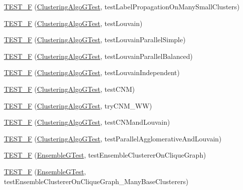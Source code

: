 \begin{DoxyCompactItemize}
\item 
\hyperlink{namespace_networ_kit_a87a47f3d8a91ea2de2890ab1a06303c2}{T\-E\-S\-T\-\_\-\-F} (\hyperlink{class_networ_kit_1_1_clustering_algo_g_test}{Clustering\-Algo\-G\-Test}, test\-Label\-Propagation\-On\-Many\-Small\-Clusters)
\item 
\hyperlink{namespace_networ_kit_a36b2e47c2b5111304a84cb487a660627}{T\-E\-S\-T\-\_\-\-F} (\hyperlink{class_networ_kit_1_1_clustering_algo_g_test}{Clustering\-Algo\-G\-Test}, test\-Louvain)
\item 
\hyperlink{namespace_networ_kit_a207fff0cd3cd77438f7cbe5aab6f9437}{T\-E\-S\-T\-\_\-\-F} (\hyperlink{class_networ_kit_1_1_clustering_algo_g_test}{Clustering\-Algo\-G\-Test}, test\-Louvain\-Parallel\-Simple)
\item 
\hyperlink{namespace_networ_kit_a255301f28ee0cc37ff098fc75e60c37b}{T\-E\-S\-T\-\_\-\-F} (\hyperlink{class_networ_kit_1_1_clustering_algo_g_test}{Clustering\-Algo\-G\-Test}, test\-Louvain\-Parallel\-Balanced)
\item 
\hyperlink{namespace_networ_kit_a26469c703678f995168ed5c56d7f5162}{T\-E\-S\-T\-\_\-\-F} (\hyperlink{class_networ_kit_1_1_clustering_algo_g_test}{Clustering\-Algo\-G\-Test}, test\-Louvain\-Independent)
\item 
\hyperlink{namespace_networ_kit_a3b3543230650918a0c84cedfd0fa83ee}{T\-E\-S\-T\-\_\-\-F} (\hyperlink{class_networ_kit_1_1_clustering_algo_g_test}{Clustering\-Algo\-G\-Test}, test\-C\-N\-M)
\item 
\hyperlink{namespace_networ_kit_a80cc8a066b13366c4eab92a9f14e778a}{T\-E\-S\-T\-\_\-\-F} (\hyperlink{class_networ_kit_1_1_clustering_algo_g_test}{Clustering\-Algo\-G\-Test}, try\-C\-N\-M\-\_\-\-W\-W)
\item 
\hyperlink{namespace_networ_kit_a1c6009d3869af2f347c71c62f49c7874}{T\-E\-S\-T\-\_\-\-F} (\hyperlink{class_networ_kit_1_1_clustering_algo_g_test}{Clustering\-Algo\-G\-Test}, test\-C\-N\-Mand\-Louvain)
\item 
\hyperlink{namespace_networ_kit_a6fe3b4f93590fb2ca86f283ebc2b5366}{T\-E\-S\-T\-\_\-\-F} (\hyperlink{class_networ_kit_1_1_clustering_algo_g_test}{Clustering\-Algo\-G\-Test}, test\-Parallel\-Agglomerative\-And\-Louvain)
\item 
\hyperlink{namespace_networ_kit_a564f49207cf5c5bc26f822ab61e487a1}{T\-E\-S\-T\-\_\-\-F} (\hyperlink{class_networ_kit_1_1_ensemble_g_test}{Ensemble\-G\-Test}, test\-Ensemble\-Clusterer\-On\-Clique\-Graph)
\item 
\hyperlink{namespace_networ_kit_a1ec91cf47d849707d2972eabe5a98e5b}{T\-E\-S\-T\-\_\-\-F} (\hyperlink{class_networ_kit_1_1_ensemble_g_test}{Ensemble\-G\-Test}, test\-Ensemble\-Clusterer\-On\-Clique\-Graph\-\_\-\-Many\-Base\-Clusterers)

\end{DoxyCompactItemize}
